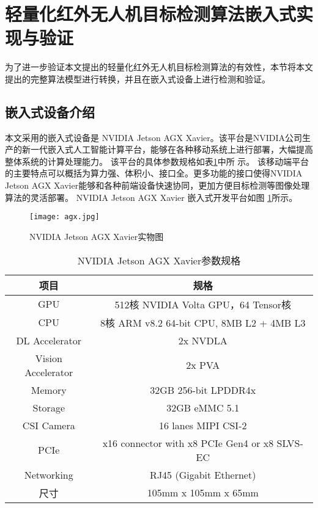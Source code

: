 \section{轻量化红外无人机目标检测算法嵌入式实现与验证}
为了进一步验证本文提出的轻量化红外无人机目标检测算法的有效性，本节将本文提出的完整算法模型进行转换，并且在嵌入式设备上进行检测和验证。

\subsection{嵌入式设备介绍}

本文采用的嵌入式设备是
NVIDIA
Jetson AGX Xavier。该平台是NVIDIA公司生产的新一代嵌入式人工智能计算平台，能够在各种移动系统上进行部署，大幅提高整体系统的计算处理能力。
该平台的具体参数规格如表\ref{t1}中所
示。
该移动端平台的主要特点可以概括为算力强、体积小、接口全。更多功能的接口使得NVIDIA Jetson AGX Xavier能够和各种前端设备快速协同，更加方便目标检测等图像处理算法的灵活部署。
NVIDIA Jetson AGX Xavier 嵌入式开发平台如图
\ref{agx}所示。

\begin{figure}[htbp]
    \centering
    \texttt{[image: agx.jpg]}
    \caption{NVIDIA Jetson AGX Xavier实物图}
    \label{agx}
\end{figure}

\begin{table}[htbp]
    \caption{NVIDIA Jetson AGX Xavier参数规格}
    \vspace{0.5em}\centering\wuhao
    \begin{tabular}{cc}
    \toprule
    项目 & 规格\\
    \midrule
    GPU & 512核 NVIDIA Volta GPU，64 Tensor核\\
    CPU & 8核 ARM v8.2 64-bit CPU, 8MB L2 + 4MB L3\\
    DL Accelerator & 2x NVDLA\\
    Vision Accelerator & 2x PVA\\
    Memory & 32GB 256-bit LPDDR4x\\
    Storage & 32GB eMMC 5.1\\
    CSI Camera & 16 lanes MIPI CSI-2\\
    PCIe & x16 connector with x8 PCIe Gen4 or x8 SLVS-EC\\
    Networking & RJ45 (Gigabit Ethernet)\\
    尺寸 & 105mm x 105mm x 65mm\\
    \bottomrule
    \end{tabular}
    \label{t1}
\end{table}


